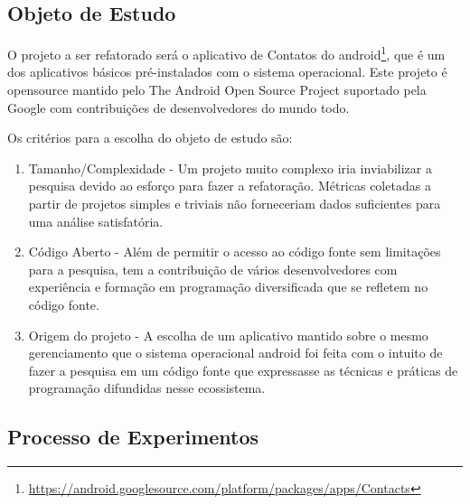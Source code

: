 \subsection{Objeto de Estudo}


O projeto a ser refatorado será o aplicativo de Contatos do
android\footnote{\url{https://android.googlesource.com/platform/packages/apps/Contacts}},
que é um dos aplicativos básicos pré-instalados com o sistema operacional. Este
projeto é opensource mantido pelo  The Android Open Source Project suportado
pela Google com contribuições de desenvolvedores do mundo todo.

Os critérios para a escolha do objeto de estudo são:

\begin{enumerate}
  \item Tamanho/Complexidade - Um projeto muito complexo iria inviabilizar a
  pesquisa devido ao esforço para fazer a refatoração. Métricas coletadas
  a partir de projetos simples e triviais não forneceriam dados suficientes para
  uma análise satisfatória.
  \item Código Aberto - Além de permitir o acesso ao código fonte sem
  limitações para a pesquisa, tem a contribuição de vários desenvolvedores com
  experiência e formação em programação diversificada que se refletem no código fonte.
  \item Origem do projeto - A escolha de um aplicativo mantido sobre o mesmo
  gerenciamento que o sistema operacional android foi feita com o intuito de
  fazer a pesquisa em um código fonte que expressasse as técnicas e práticas de
  programação difundidas nesse ecossistema.
\end{enumerate}

\subsection{Processo de Experimentos}


